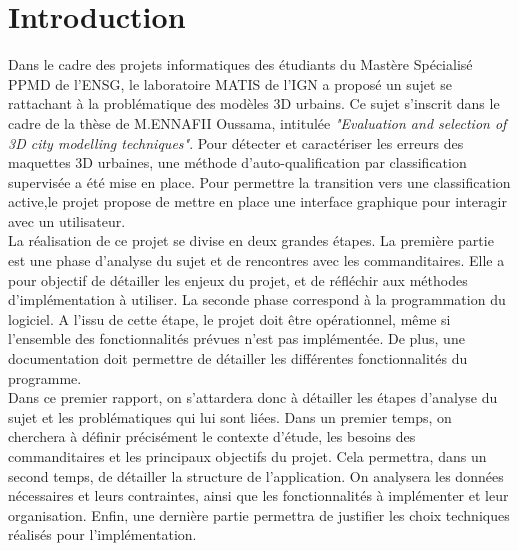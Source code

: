\documentclass{themeensg}
\begin{document}
\newpage
\chapter*{Introduction}
  
  \vspace{1.5cm}
Dans le cadre des projets informatiques des étudiants du Mastère Spécialisé PPMD de l'ENSG, le laboratoire MATIS de l'IGN a proposé un sujet se rattachant à la problématique des modèles 3D urbains. Ce sujet s'inscrit dans le cadre de la thèse de M.ENNAFII Oussama, intitulée \emph{"Evaluation and selection of 3D city modelling techniques"}. Pour détecter et caractériser les erreurs des maquettes 3D urbaines, une méthode d'auto-qualification par classification supervisée a été mise en place. Pour permettre la transition vers une classification active,le projet propose de mettre en place une interface graphique pour interagir avec un utilisateur.\\

La réalisation de ce projet se divise en deux grandes étapes. La première partie est une phase d'analyse du sujet et de rencontres avec les commanditaires. Elle a pour objectif de détailler les enjeux du projet, et de réfléchir aux méthodes d'implémentation à utiliser. La seconde phase correspond à la programmation du logiciel. A l'issu de cette étape, le projet doit être opérationnel, même si l'ensemble des fonctionnalités prévues n'est pas implémentée. De plus, une documentation doit permettre de détailler les différentes fonctionnalités du programme.\\

Dans ce premier rapport, on s'attardera donc à détailler les étapes d'analyse du sujet et les problématiques qui lui sont liées. Dans un premier temps, on cherchera à définir précisément le contexte d'étude, les besoins des commanditaires et les principaux objectifs du projet. Cela permettra, dans un second temps, de détailler la structure de l'application. On analysera les données nécessaires et leurs contraintes, ainsi que les fonctionnalités à implémenter et leur organisation. Enfin, une dernière partie permettra de justifier les choix techniques réalisés pour l'implémentation.

\end{document}
